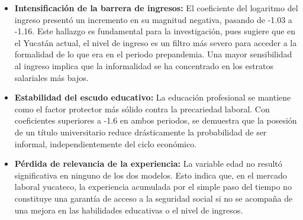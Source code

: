 \begin{itemize}
    \item \textbf{Intensificación de la barrera de ingresos:} El coeficiente del logaritmo del ingreso presentó un incremento en su magnitud negativa, pasando de -1.03 a -1.16. Este hallazgo es fundamental para la investigación, pues sugiere que en el Yucatán actual, el nivel de ingreso es un filtro más severo para acceder a la formalidad de lo que era en el periodo prepandemia. Una mayor sensibilidad al ingreso implica que la informalidad se ha concentrado en los estratos salariales más bajos.
    
    \item \textbf{Estabilidad del escudo educativo:} La educación profesional se mantiene como el factor protector más sólido contra la precariedad laboral. Con coeficientes superiores a -1.6 en ambos periodos, se demuestra que la posesión de un título universitario reduce drásticamente la probabilidad de ser informal, independientemente del ciclo económico.
    
    \item \textbf{Pérdida de relevancia de la experiencia:} La variable edad no resultó significativa en ninguno de los dos modelos. Esto indica que, en el mercado laboral yucateco, la experiencia acumulada por el simple paso del tiempo no constituye una garantía de acceso a la seguridad social si no se acompaña de una mejora en las habilidades educativas o el nivel de ingresos.
    
\end{itemize}

